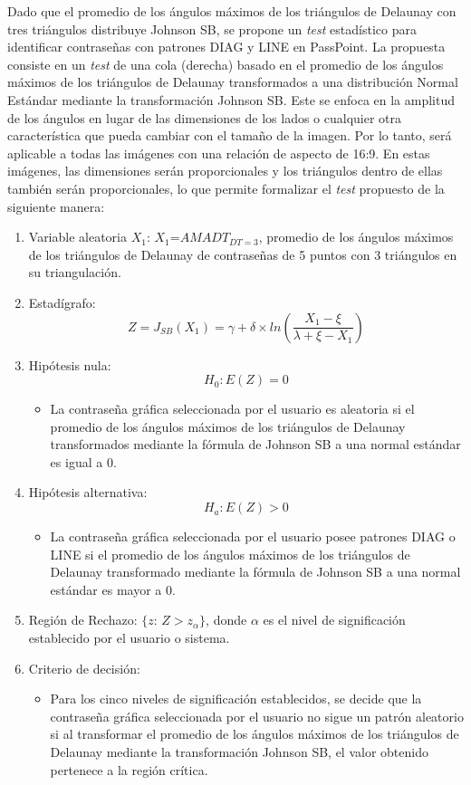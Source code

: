 \documentclass[12pt]{report}
\begin{document}
Dado  que el promedio de los ángulos máximos de los triángulos de Delaunay con tres triángulos distribuye Johnson SB, se propone un  \textit{test} estadístico para identificar contraseñas con patrones DIAG y LINE en PassPoint. La propuesta consiste en un \textit{test} de una cola (derecha) basado en el promedio de los ángulos máximos de los triángulos de Delaunay transformados a una distribución Normal Estándar mediante la transformación Johnson SB.
Este se enfoca en la amplitud de los ángulos en lugar de las dimensiones de los lados o cualquier otra característica que pueda cambiar con el tamaño de la imagen. Por lo tanto, será aplicable a todas las imágenes con una relación de aspecto de 16:9. En estas imágenes, las dimensiones serán proporcionales y los triángulos dentro de ellas también serán proporcionales, lo que permite formalizar el \textit{test} propuesto de la siguiente manera:

\begin{enumerate}
	\item Variable aleatoria $X_1$: $X_1$=$AMADT_{DT=3}$, promedio de los ángulos máximos de los triángulos de Delaunay de contraseñas de 5 puntos con 3 triángulos en su triangulación.
	\item Estadígrafo: \[
	Z= J_{SB}(X_1) =  \gamma + \delta \times ln\left(\frac{X_1 - \xi}{\lambda + \xi - X_1}\right)
	\]

	\item Hipótesis nula: \[H_0:E(Z)=0\]
	\begin{itemize}
		\item La contraseña gráfica seleccionada por el usuario es aleatoria si el promedio de los ángulos máximos de los triángulos de Delaunay  transformados mediante la fórmula de Johnson SB a una normal estándar es igual a 0.
	\end{itemize}
	
	
	\item Hipótesis alternativa: \[H_a:E(Z)>0\]
			\begin{itemize}
			\item La contraseña gráfica seleccionada por el usuario posee patrones DIAG o LINE  si el promedio de los ángulos máximos de los triángulos de Delaunay  transformado mediante la fórmula de Johnson SB a una normal estándar es mayor a 0.
		\end{itemize}
	
	\item  Región de Rechazo: $\{z$: \;$Z>z_\alpha\}$, donde $\alpha$ es el nivel de significación establecido por el usuario o sistema. 
	
	\item Criterio de decisión:
	\begin{itemize}
		\item Para los cinco niveles de significación establecidos, se decide que la contraseña gráfica seleccionada por el usuario no sigue un patrón aleatorio si al transformar el promedio de los ángulos máximos de los triángulos de Delaunay mediante la transformación Johnson SB, el valor obtenido pertenece a la región crítica. 
	\end{itemize}
	\end{enumerate}	 
\end{document}

